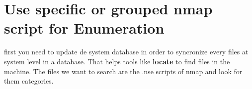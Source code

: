 \documentclass{assets/ipesethesis}
\newenvironment{Shaded}{\begin{snugshade}}{\end{snugshade}}
\newcommand{\BuiltInTok}[1]{#1}
\newcommand{\CommentTok}[1]{\textcolor[rgb]{0.56,0.35,0.01}{\textit{#1}}}
\newcommand{\ExtensionTok}[1]{#1}
\newcommand{\FunctionTok}[1]{\textcolor[rgb]{0.00,0.00,0.00}{#1}}
\newcommand{\KeywordTok}[1]{\textcolor[rgb]{0.13,0.29,0.53}{\textbf{#1}}}
\newcommand{\NormalTok}[1]{#1}
\newcommand{\OperatorTok}[1]{\textcolor[rgb]{0.81,0.36,0.00}{\textbf{#1}}}
\newcommand{\StringTok}[1]{\textcolor[rgb]{0.31,0.60,0.02}{#1}}
\newcommand{\VariableTok}[1]{\textcolor[rgb]{0.00,0.00,0.00}{#1}}
\begin{document}
\begin{Shaded}
\end{Shaded}

\hypertarget{use-specific-or-grouped-nmap-script-for-enumeration}{%
\section*{Use specific or grouped nmap script for Enumeration}\label{use-specific-or-grouped-nmap-script-for-enumeration}}

first you need to update de system database in order to syncronize every files at system level in a database. That helps tools like
\textbf{locate} to find files in the machine. The files we want to search are the .nse scripts of nmap and look for them categories.
\end{document}
